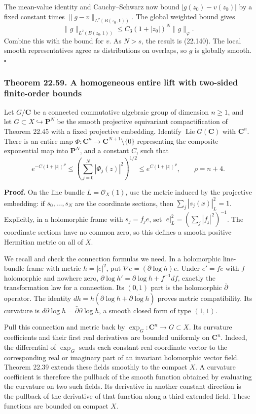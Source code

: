 \documentclass[
  11pt,
  a4paper,
]{article}
\begin{document}
The mean-value identity and Cauchy--Schwarz now bound
\(|g(z_0)-v(z_0)|\) by a fixed constant times
\(\|g-v\|_{L^2(B(z_0,1))}\). The global weighted bound gives \[
 \|g\|_{L^2(B(z_0,1))}
 \le C_3(1+|z_0|)^N\|g\|_\varphi.
 \tag{22.146}
\] Combine this with the bound for \(v\). As \(N>s\), the result is
(22.140). The local smooth representatives agree as distributions on
overlaps, so \(g\) is globally smooth. \(\square\)

\subsubsection{Theorem 22.59. A homogeneous entire lift with two-sided
finite-order
bounds}\label{theorem-22.59.-a-homogeneous-entire-lift-with-two-sided-finite-order-bounds}

Let \(G/\mathbf C\) be a connected commutative algebraic group of
dimension \(n\ge1\), and let \(G\subset X\hookrightarrow\mathbf P^N\) be
the smooth projective equivariant compactification of Theorem 22.45 with
a fixed projective embedding. Identify
\(\operatorname{Lie}G(\mathbf C)\) with \(\mathbf C^n\). There is an
entire map \(\Phi:\mathbf C^n\to\mathbf C^{N+1}\setminus\{0\}\)
representing the composite exponential map into \(\mathbf P^N\), and a
constant \(C\), such that \[
 e^{-C(1+|z|)^\rho}\le
 \left(\sum_{j=0}^N|\Phi_j(z)|^2\right)^{1/2}
 \le e^{C(1+|z|)^\rho},
 \qquad \rho=n+4.
 \tag{22.147}
\]

\textbf{Proof.} On the line bundle \(L=\mathcal O_X(1)\), use the metric
induced by the projective embedding: if \(s_0,\ldots,s_N\) are the
coordinate sections, then \(\sum_j|s_j(x)|_L^2=1\). Explicitly, in a
holomorphic frame with \(s_j=f_j e\), set
\(|e|_L^2=(\sum_j|f_j|^2)^{-1}\). The coordinate sections have no common
zero, so this defines a smooth positive Hermitian metric on all of
\(X\).

We recall and check the connection formulas we need. In a holomorphic
line-bundle frame with metric \(h=|e|^2\), put
\(\nabla e=(\partial\log h)e\). Under \(e'=f e\) with \(f\) holomorphic
and nowhere zero, \(\partial\log h'=\partial\log h+f^{-1}df\), exactly
the transformation law for a connection. Its \((0,1)\) part is the
holomorphic \(\bar\partial\) operator. The identity
\(d h=h(\partial\log h+\overline{\partial\log h})\) proves metric
compatibility. Its curvature is
\(d\partial\log h=\bar\partial\partial\log h\), a smooth closed form of
type \((1,1)\).

Pull this connection and metric back by
\(\exp_G:\mathbf C^n\to G\subset X\). Its curvature coefficients and
their first real derivatives are bounded uniformly on \(\mathbf C^n\).
Indeed, the differential of \(\exp_G\) sends each constant real
coordinate vector to the corresponding real or imaginary part of an
invariant holomorphic vector field. Theorem 22.39 extends these fields
smoothly to the compact \(X\). A curvature coefficient is therefore the
pullback of the smooth function obtained by evaluating the curvature on
two such fields. Its derivative in another constant direction is the
pullback of the derivative of that function along a third extended
field. These functions are bounded on compact \(X\).
\end{document}
